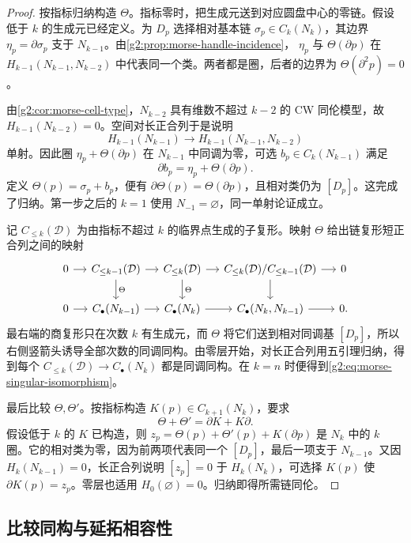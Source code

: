\begin{proof}
	按指标归纳构造 \(\Theta\)。指标零时，把生成元送到对应圆盘中心的零链。假设低于 \(k\) 的生成元已经定义。为 \(D_p\) 选择相对基本链 \(\sigma_p\in C_k(N_k)\)，其边界 \(\eta_p=\partial\sigma_p\) 支于 \(N_{k-1}\)。由\cref{g2:prop:morse-handle-incidence}，
	\(\eta_p\) 与 \(\Theta(\partial p)\) 在 \(H_{k-1}(N_{k-1},N_{k-2})\) 中代表同一个类。两者都是圈，后者的边界为 \(\Theta(\partial^2p)=0\)。

	由\cref{g2:cor:morse-cell-type}，\(N_{k-2}\) 具有维数不超过 \(k-2\) 的 CW 同伦模型，故 \(H_{k-1}(N_{k-2})=0\)。空间对长正合列于是说明
	\[
		H_{k-1}(N_{k-1})\longrightarrow H_{k-1}(N_{k-1},N_{k-2})
	\]
	单射。因此圈 \(\eta_p+\Theta(\partial p)\) 在 \(N_{k-1}\) 中同调为零，可选 \(b_p\in C_k(N_{k-1})\) 满足
	\[
		\partial b_p=\eta_p+\Theta(\partial p).
	\]
	定义 \(\Theta(p)=\sigma_p+b_p\)，便有 \(\partial\Theta(p)=\Theta(\partial p)\)，且相对类仍为 \([D_p]\)。这完成了归纳。第一步之后的 \(k=1\) 使用 \(N_{-1}=\varnothing\)，同一单射论证成立。

	记 \(C_{\le k}(\mathcal D)\) 为由指标不超过 \(k\) 的临界点生成的子复形。映射 \(\Theta\) 给出链复形短正合列之间的映射
	\[
		\begin{tikzcd}[column sep=small]
			0 \arrow[r]&C_{\le k-1}(\mathcal D)\arrow[r]\arrow[d,"\Theta"]&
			C_{\le k}(\mathcal D)\arrow[r]\arrow[d,"\Theta"]&
			C_{\le k}(\mathcal D)/C_{\le k-1}(\mathcal D)\arrow[r]\arrow[d]&0\\
			0 \arrow[r]&C_\bullet(N_{k-1})\arrow[r]&
			C_\bullet(N_k)\arrow[r]&
			C_\bullet(N_k,N_{k-1})\arrow[r]&0.
		\end{tikzcd}
	\]
	最右端的商复形只在次数 \(k\) 有生成元，而 \(\Theta\) 将它们送到相对同调基 \([D_p]\)，所以右侧竖箭头诱导全部次数的同调同构。由零层开始，对长正合列用五引理归纳，得到每个 \(C_{\le k}(\mathcal D)\to C_\bullet(N_k)\) 都是同调同构。在 \(k=n\) 时便得到\eqref{g2:eq:morse-singular-isomorphism}。

	最后比较 \(\Theta,\Theta'\)。按指标构造 \(K(p)\in C_{k+1}(N_k)\)，要求
	\[
		\Theta+\Theta'=\partial K+K\partial.
	\]
	假设低于 \(k\) 的 \(K\) 已构造，则
	\(z_p=\Theta(p)+\Theta'(p)+K(\partial p)\)
	是 \(N_k\) 中的 \(k\) 圈。它的相对类为零，因为前两项代表同一个 \([D_p]\)，最后一项支于 \(N_{k-1}\)。又因 \(H_k(N_{k-1})=0\)，长正合列说明 \([z_p]=0\) 于 \(H_k(N_k)\)，可选择 \(K(p)\) 使 \(\partial K(p)=z_p\)。零层也适用 \(H_0(\varnothing)=0\)。归纳即得所需链同伦。
\end{proof}

\subsection{比较同构与延拓相容性}
\label{g2:subsec:1804:04}

